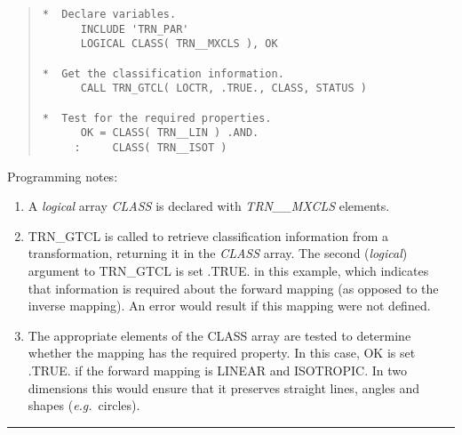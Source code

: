 \documentclass[twoside,11pt]{article}
\newcommand{\name}[1]{\mbox{\small{#1}}}
\newcommand{\fortvar}[1]{\mbox{\emph{#1}}}
\newcommand{\numcir}[1]{\mbox{\hspace{3ex}\fbox{#1}}}
\newcommand{\exampledone}[0]{\begin{center} \rule{6em}{0.2mm} \end{center}}
\begin{document}
\begin{quote} \begin{tabbing} 

\verb#*  Declare variables.                                  #\\
\verb#      INCLUDE 'TRN_PAR'                                #\\
\verb#      LOGICAL CLASS( TRN__MXCLS ), OK                  #\numcir{1}\\
\verb#                                                       #\\
\verb#*  Get the classification information.                 #\\
\verb#      CALL TRN_GTCL( LOCTR, .TRUE., CLASS, STATUS )    #\numcir{2}\\
\verb#                                                       #\\
\verb#*  Test for the required properties.                   #\\
\verb#      OK = CLASS( TRN__LIN ) .AND.                     #\numcir{3}\\
\verb#     :     CLASS( TRN__ISOT )                          # 

\end{tabbing}
\end{quote} 

Programming notes:

\begin{enumerate} 

\item A \emph{logical} array \fortvar{CLASS} is declared with
\fortvar{TRN\_\_MXCLS} elements. 

\item \name{TRN\_GTCL} is called to retrieve classification information from
a transformation, returning it in the \fortvar{CLASS} array.
The second (\emph{logical}) argument to \name{TRN\_GTCL} is set \name{.TRUE.}
in this example, which indicates that information is required about the
forward mapping (as opposed to the inverse mapping). 
An error would result if this mapping were not defined.

\item The appropriate elements of the \name{CLASS} array are tested to
determine whether the mapping has the required property.
In this case, \name{OK} is set \name{.TRUE.} if the forward mapping is
\name{LINEAR} and \name{ISOTROPIC}. 
In two dimensions this would ensure that it preserves straight lines, angles
and shapes (\emph{e.g.}\ circles). 

\end{enumerate}
\exampledone 
\end{document}

